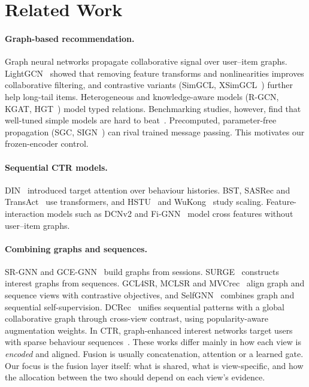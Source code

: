 \documentclass[sigconf,anonymous,review]{acmart}
\begin{document}
\section{Related Work}

\paragraph{Graph-based recommendation.}
Graph neural networks propagate collaborative signal over user--item graphs.
LightGCN~\cite{he2020lightgcn} showed that removing feature transforms and
nonlinearities improves collaborative filtering, and contrastive variants
(SimGCL, XSimGCL~\cite{yu2022simgcl,yu2023xsimgcl}) further help long-tail
items. Heterogeneous and knowledge-aware models
(R-GCN, KGAT, HGT~\cite{schlichtkrull2018rgcn,wang2019kgat,hu2020hgt})
model typed relations. Benchmarking studies, however, find that well-tuned
simple models are hard to beat~\cite{lv2021simplehgn,dacrema2019progress,rendle2020ncf}.
Precomputed, parameter-free propagation (SGC, SIGN~\cite{wu2019sgc,frasca2020sign})
can rival trained message passing. This motivates our frozen-encoder control.

\paragraph{Sequential CTR models.}
DIN~\cite{zhou2018din} introduced target attention over behaviour histories.
BST, SASRec and TransAct~\cite{chen2019bst,kang2018sasrec,xia2023transact}
use transformers, and HSTU~\cite{zhai2024hstu} and
WuKong~\cite{zhang2024wukong} study scaling. Feature-interaction models such
as DCNv2 and Fi-GNN~\cite{wang2021dcnv2,li2019fignn} model cross features
without user--item graphs.

\paragraph{Combining graphs and sequences.}
SR-GNN and GCE-GNN~\cite{wu2019srgnn,wang2020gcegnn} build graphs from
sessions. SURGE~\cite{chang2021surge} constructs interest graphs from
sequences. GCL4SR, MCLSR and MVCrec~\cite{zhang2022gcl4sr,wang2022mclsr,zhou2026mvcrec}
align graph and sequence views with contrastive objectives, and
SelfGNN~\cite{liu2024selfgnn} combines graph and sequential self-supervision.
DCRec~\cite{yang2023dcrec} unifies sequential patterns with a global
collaborative graph through cross-view contrast, using popularity-aware
augmentation weights. In CTR, graph-enhanced interest networks target users
with sparse behaviour sequences~\cite{liu2025geinsparse}. These works differ
mainly in how each view is \emph{encoded} and aligned. Fusion is usually
concatenation, attention or a learned gate. Our focus is the fusion layer
itself: what is shared, what is view-specific, and how the allocation between
the two should depend on each view's evidence.
\end{document}
